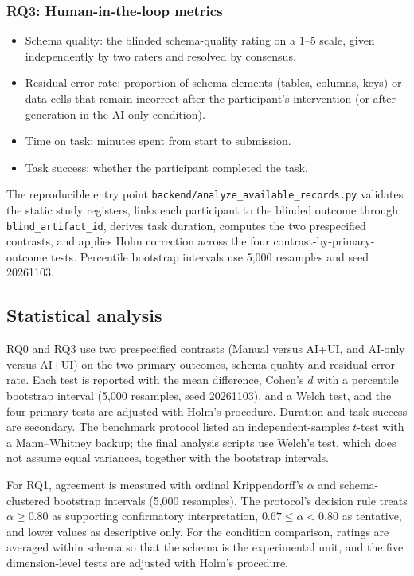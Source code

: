 \documentclass[11pt,a4paper]{article}
\begin{document}
\subsubsection{RQ3: Human-in-the-loop metrics}
\begin{itemize}
  \item Schema quality: the blinded schema-quality rating on a 1--5 scale, given independently by two raters and resolved by consensus.
  \item Residual error rate: proportion of schema elements (tables, columns, keys) or data cells that remain incorrect after the participant's intervention (or after generation in the AI-only condition).
  \item Time on task: minutes spent from start to submission.
  \item Task success: whether the participant completed the task.
\end{itemize}

The reproducible entry point \texttt{backend/analyze\_available\_records.py}
validates the static study registers, links each participant to the blinded
outcome through \texttt{blind\_artifact\_id}, derives task duration, computes the
two prespecified contrasts, and applies Holm correction across the four
contrast-by-primary-outcome tests. Percentile bootstrap intervals use 5,000
resamples and seed 20261103.

\subsection{Statistical analysis}
RQ0 and RQ3 use two prespecified contrasts (Manual versus AI+UI, and AI-only versus AI+UI) on the two primary outcomes, schema quality and residual error rate. Each test is reported with the mean difference, Cohen's $d$ with a percentile bootstrap interval (5,000 resamples, seed 20261103), and a Welch test, and the four primary tests are adjusted with Holm's procedure. Duration and task success are secondary. The benchmark protocol listed an independent-samples $t$-test with a Mann--Whitney backup; the final analysis scripts use Welch's test, which does not assume equal variances, together with the bootstrap intervals.

For RQ1, agreement is measured with ordinal Krippendorff's $\alpha$ and schema-clustered bootstrap intervals (5,000 resamples). The protocol's decision rule treats $\alpha\ge0.80$ as supporting confirmatory interpretation, $0.67\le\alpha<0.80$ as tentative, and lower values as descriptive only. For the condition comparison, ratings are averaged within schema so that the schema is the experimental unit, and the five dimension-level tests are adjusted with Holm's procedure.
\end{document}
